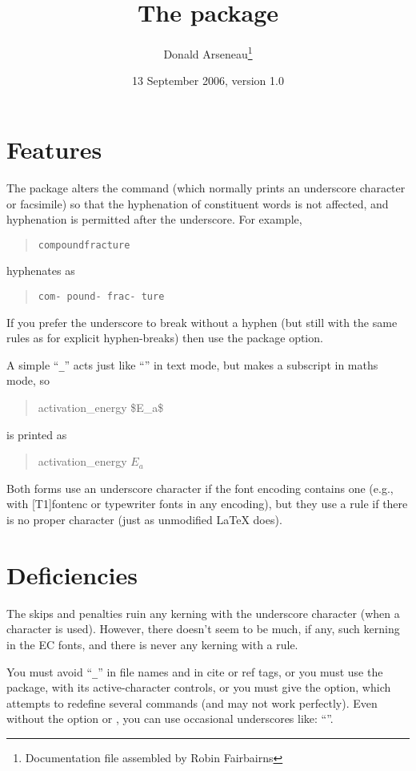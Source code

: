 \documentclass[a4paper]{article}
\begin{document}
\title{The  package}
\author{Donald Arseneau\thanks{Documentation file assembled by Robin
    Fairbairns}}
\date{13 September 2006, version 1.0}
\maketitle

\section*{Features}

The package alters the command \cs{_} (which normally prints
an underscore character or facsimile) so that the hyphenation of
constituent words is not affected, and hyphenation is permitted after
the underscore.  For example,
\begin{quote}
  \texttt{compound\cs{_}fracture}
\end{quote}
hyphenates as
\begin{quote}
  \texttt{com- pound\cs{_}- frac- ture}
\end{quote}
If you prefer the underscore to break without a hyphen (but still with
the same rules as for explicit hyphen-breaks) then use the
\option[nohyphen] package option.

A simple ``\texttt{_}'' acts just like ``\cs{_}'' in text
mode, but makes a subscript in maths mode, so
\begin{quote}
  \ttfamily activation_energy \$E_a\$
\end{quote}
is printed as
\begin{quote}
  activation_energy $E_a$
\end{quote}

Both forms use an underscore character if the font encoding contains
one (e.g., with [T1]{fontenc} or typewriter
fonts in any encoding), but they use a rule if there is no proper
character (just as unmodified \LaTeX{} does).

\section*{Deficiencies}

The skips and penalties ruin any kerning with the underscore character
(when a character is used).  However, there doesn't seem to be much, if
any, such kerning in the EC fonts, and there is never any kerning with
a rule.

You must avoid ``\texttt{_}'' in file names and in cite or ref tags, or you must
use the  package, with its active-character controls,
or you must give the \option[strings] option, which attempts to
redefine several commands (and may not work perfectly).  Even without
the \option[strings] option or , you can use occasional
underscores like: ``''.
\end{document}
